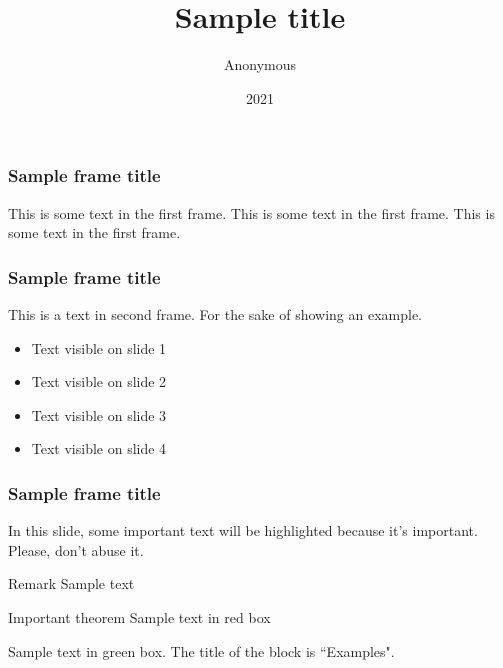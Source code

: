 \documentclass{beamer}
\title{Sample title}
\author{Anonymous}
\institute{Overleaf}
\date{2021}
\begin{document}
\frame{\titlepage}

\begin{frame}
\frametitle{Sample frame title}
This is some text in the first frame. This is some text in the first frame. This is some text in the first frame.
\end{frame}

\begin{frame}
\frametitle{Sample frame title}
This is a text in second frame. 
For the sake of showing an example.

\begin{itemize}
 \item<1-> Text visible on slide 1
 \item<2-> Text visible on slide 2
 \item<3> Text visible on slide 3
 \item<4-> Text visible on slide 4
\end{itemize}
\end{frame}

\begin{frame}
\frametitle{Sample frame title}

In this slide, some important text will be
\alert{highlighted} because it's important.
Please, don't abuse it.

\begin{block}{Remark}
Sample text
\end{block}

\begin{alertblock}{Important theorem}
Sample text in red box
\end{alertblock}

\begin{examples}
Sample text in green box. The title of the block is ``Examples".
\end{examples}
\end{frame}
\end{document}
